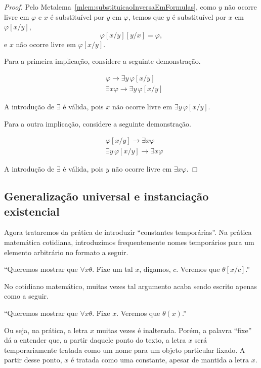 \begin{proof}
    Pelo Metalema~\ref{mlem:substituicaoInversaEmFormulas}, como $y$ não ocorre livre em $\varphi$ e $x$ é substituível por $y$ em $\varphi$, temos que $y$ é substituível por $x$ em $\varphi[x/y]$,
    \[
        \varphi[x/y][y/x]=\varphi,
    \]
    e $x$ não ocorre livre em $\varphi[x/y]$.

    Para a primeira implicação, considere a seguinte demonstração.

    \begin{align*}
        &\varphi\rightarrow \exists y\,\varphi[x/y] \tag{FO15 e substituição inversa}\\
        &\exists x\varphi\rightarrow \exists y\,\varphi[x/y] \tag{Introdução de $\exists$}
    \end{align*}

    A introdução de $\exists$ é válida, pois $x$ não ocorre livre em $\exists y\,\varphi[x/y]$.

    Para a outra implicação, considere a seguinte demonstração.

    \begin{align*}
        &\varphi[x/y]\rightarrow \exists x\varphi \tag{FO15}\\
        &\exists y\,\varphi[x/y]\rightarrow \exists x\varphi \tag{Introdução de $\exists$}
    \end{align*}

    A introdução de $\exists$ é válida, pois $y$ não ocorre livre em $\exists x\varphi$.
\end{proof}

\subsection{Generalização universal e instanciação existencial}

Agora trataremos da prática de introduzir ``constantes temporárias''.
Na prática matemática cotidiana, introduzimos frequentemente nomes temporários para um elemento arbitrário no formato a seguir.

``Queremos mostrar que $\forall x \theta$.
Fixe um tal $x$, digamos, $c$.
Veremos que $\theta[x/c]$.''

No cotidiano matemático, muitas vezes tal argumento acaba sendo escrito apenas como a seguir.

``Queremos mostrar que $\forall x \theta$.
Fixe $x$.
Veremos que $\theta(x)$.''

Ou seja, na prática, a letra $x$ muitas vezes é inalterada.
Porém, a palavra ``fixe'' dá a entender que, a partir daquele ponto do texto, a letra $x$ será temporariamente tratada como um nome para um objeto particular fixado.
A partir desse ponto, $x$ é tratada como uma constante, apesar de mantida a letra $x$.

